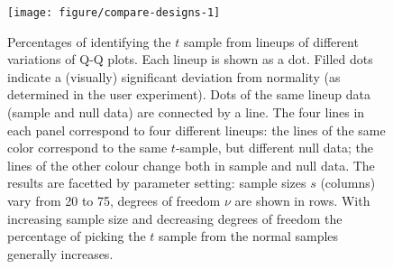 \documentclass{article}\usepackage[]{graphicx}\usepackage[]{color}
\newenvironment{knitrout}{}{} %
\newcommand{\hh}[1]{{\color{magenta} #1}}
\begin{document}
\begin{figure}[ht]
\centering
\begin{knitrout}
\color{fgcolor}
\texttt{[image: figure/compare-designs-1]} 

\end{knitrout}
\caption{\label{fig:compare} \hh{Percentages of identifying the $t$ sample from lineups of different variations of Q-Q plots. Each lineup is shown as a dot. Filled dots indicate a (visually) significant deviation from normality (as determined in the user experiment). Dots of the same lineup data (sample and null data) are connected by a line.
The four lines in each panel correspond to four different lineups: the lines of the same color correspond to the same $t$-sample, but different null data; the lines of the other colour change both in sample and null data. The results are facetted by parameter setting: sample sizes $s$ (columns) vary from 20 to 75, degrees of freedom $\nu$ are shown in rows. With increasing sample size and decreasing degrees of freedom the percentage of picking the $t$ sample  from the normal samples generally increases. }
 }
\end{figure}
\end{document}
